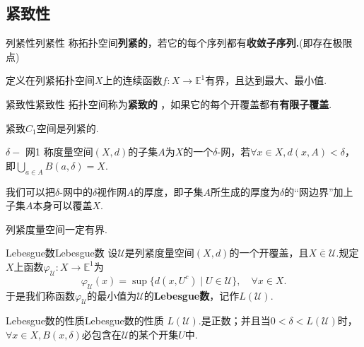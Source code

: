 \documentclass{ctexart}
\begin{document}
\subsection{紧致性}
\begin{定义}{列紧性}{列紧性}
	称拓扑空间\textbf{列紧的}，若它的每个序列都有\textbf{收敛子序列.}(即存在极限点)
\end{定义}
\begin{命题}{}{}
	定义在列紧拓扑空间$X$上的连续函数$f:X\to \mathbb{E}^1$有界，且达到最大、最小值.
\end{命题}
\begin{定义}{紧致性}{紧致性}
	拓扑空间称为\textbf{紧致的 }，如果它的每个开覆盖都有\textbf{有限子覆盖}.
\end{定义}
\begin{命题}{}{}
	紧致$C_1$空间是列紧的.
\end{命题}
\begin{定义}{{$\delta-$ 网}}{1}
	称度量空间$(X,d)$的子集$A$为$X$的一个{$\delta$-网}，若$\forall x{\in}X{,}d(x,A){<}\delta $，即$\displaystyle\bigcup_{a\in A}B(a,\delta)=X.$
\end{定义}
\begin{提示}
	我们可以把$\delta$-网中的$\delta$视作网$A$的厚度，即子集$A$所生成的厚度为$\delta$的“网边界”加上子集$A$本身可以覆盖$X$.
\end{提示}
\begin{结论}{}{}
	列紧度量空间一定有界.
\end{结论}
\begin{定义}{Lebesgue数}{Lebesgue数}
	设$\mathscr{U}$是列紧度量空间$(X,d)$的一个开覆盖，且$ X\overline{\in}\mathscr{U}.$规定$X$上函数$\varphi_{\mathscr{U}}:X\rightarrow\mathbb{E}^1$为
	$$
	\varphi_{\mathscr{U}}(x)=\sup\{d(x,U^{{c}})\mid U\in\mathscr{U}\},\quad\forall x\in X.
	$$
	于是我们称函数$ \varphi_{\mathscr{U}}$的最小值为$\mathscr{U}$的\textbf{Lebesgue数}，记作$L(\mathscr{U}).$
\end{定义}
\begin{命题}{Lebesgue数的性质}{Lebesgue数的性质}
	$L(\mathscr{U}).$是正数；并且当$0<\delta<L(\mathscr{U})$时，$\forall x \in X, B(x,\delta)$必包含在$\mathscr{U}$的某个开集$U$中.
\end{命题}
\end{document}
